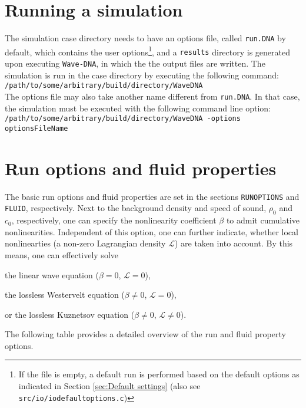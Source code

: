 \section{Running a simulation}
\label{sec:Running a simulation}

The simulation case directory needs to have an options file, called {\tt run.DNA} by default, which contains the user options\footnote{If the file is empty, a default run is performed based on the default options as indicated in Section \ref{sec:Default settings} (also see {\tt src/io/iodefaultoptions.c})}, and a {\tt results} directory is generated upon executing {\tt Wave-DNA}, in which the the output files are written. The simulation is run in the case directory by executing the following command:
\\[8pt]
{\tt /path/to/some/arbitrary/build/directory/WaveDNA}
\\[8pt]
The options file may also take another name different from {\tt run.DNA}. In that case, the simulation must be executed with the following command line option:
\\[8pt]
{\tt /path/to/some/arbitrary/build/directory/WaveDNA -options optionsFileName}
\\[8pt]


\section{Run options and fluid properties}
\label{sec:Run options and fluid properties}

The basic run options and fluid properties are set in the sections {\tt RUNOPTIONS} and {\tt FLUID}, respectively. Next to the background density and speed of sound, $\rho_0$ and $c_0$, respectively, one can specify the nonlinearity coefficient $\beta$ to admit cumulative nonlinearities. Independent of this option, one can further indicate, whether local nonlinearties (a non-zero Lagrangian density $\mathcal{L}$) are taken into account. By this means, one can effectively solve
\begin{compactitem}
\item the linear wave equation ($\beta = 0$, $\mathcal{L}=0$),
\item the lossless Westervelt equation ($\beta \neq 0$, $\mathcal{L}=0$),
\item or the lossless Kuznetsov equation ($\beta \neq 0$, $\mathcal{L}\neq 0$).
\end{compactitem}
The following table provides a detailed overview of the run and fluid property options.


